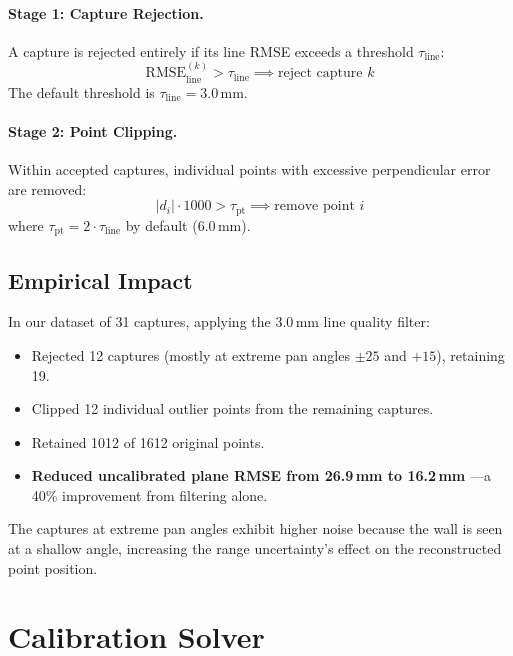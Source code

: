 \documentclass[12pt,a4paper]{article}
\begin{document}
\paragraph{Stage 1: Capture Rejection.}
A capture is rejected entirely if its line RMSE exceeds a threshold $\tau_{\text{line}}$:
\begin{equation}
    \text{RMSE}_{\text{line}}^{(k)} > \tau_{\text{line}} \implies \text{reject capture } k
    \label{eq:capture_reject}
\end{equation}
The default threshold is $\tau_{\text{line}} = 3.0$\,mm.

\paragraph{Stage 2: Point Clipping.}
Within accepted captures, individual points with excessive perpendicular
error are removed:
\begin{equation}
    |d_i| \cdot 1000 > \tau_{\text{pt}} \implies \text{remove point } i
    \label{eq:point_clip}
\end{equation}
where $\tau_{\text{pt}} = 2 \cdot \tau_{\text{line}}$ by default (6.0\,mm).

\subsection{Empirical Impact}

In our dataset of 31 captures, applying the 3.0\,mm line quality filter:
\begin{itemize}[nosep]
    \item Rejected 12 captures (mostly at extreme pan angles $\pm 25$\textdegree{}
          and $+15$\textdegree), retaining 19.
    \item Clipped 12 individual outlier points from the remaining captures.
    \item Retained 1012 of 1612 original points.
    \item \textbf{Reduced uncalibrated plane RMSE from 26.9\,mm to 16.2\,mm}
          ---a 40\% improvement from filtering alone.
\end{itemize}

The captures at extreme pan angles exhibit higher noise because the
wall is seen at a shallow angle, increasing the range uncertainty's
effect on the reconstructed point position.


\section{Calibration Solver}
\label{sec:solver}
\end{document}
